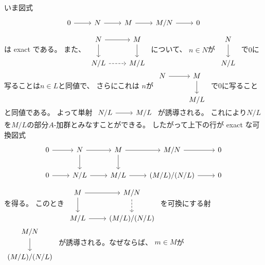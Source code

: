 \documentclass[report]{jlreq}
\begin{document}
\begin{answer}
    いま図式
    \begin{equation}
        \begin{tikzcd}
            0 \ar{r} & N \ar{r} & M \ar{r} & M / N \ar{r} & 0
        \end{tikzcd}
    \end{equation}
    は exact である。
    また、
    $\begin{tikzcd}
        N \ar{d} \ar{r} & M \ar{d} \\
        N / L \ar[dashed]{r} & M / L
    \end{tikzcd}$
    について、
    $n \in N$が
    $\begin{tikzcd}
        N \ar{d} \\
        N / L
    \end{tikzcd}$
    で$0$に写ることは$n \in L$と同値で、
    さらにこれは
    $n$が
    $\begin{tikzcd}
        N \ar{r} & M \ar{d} \\
        & M / L
    \end{tikzcd}$
    で$0$に写ることと同値である。
    よって単射
    $\begin{tikzcd}
        N / L \ar{r} & M / L
    \end{tikzcd}$
    が誘導される。
    これにより$N / L$を$M / L$の部分$A$-加群とみなすことができる。
    したがって上下の行が exact な可換図式
    \begin{equation}
        \begin{tikzcd}
            0 \ar{r}
                & N \ar{d} \ar{r}
                & M \ar{d} \ar{r}
                & M / N \ar{r}
                & 0 \\
            0 \ar{r}
                & N / L \ar{r}
                & M / L \ar{r}
                & (M / L) / (N / L) \ar{r}
                & 0
        \end{tikzcd}
    \end{equation}
    を得る。
    このとき
    $\begin{tikzcd}
        M \ar{d} \ar{r} & M / N \ar[dashed]{d} \\
        M / L \ar{r} & (M / L) / (N / L)
    \end{tikzcd}$
    を可換にする射
    $\begin{tikzcd}
        M / N \ar{d} \\
        (M / L) / (N / L)
    \end{tikzcd}$
    が誘導される。なぜならば、
    $m \in M$が

\end{answer}
\end{document}
